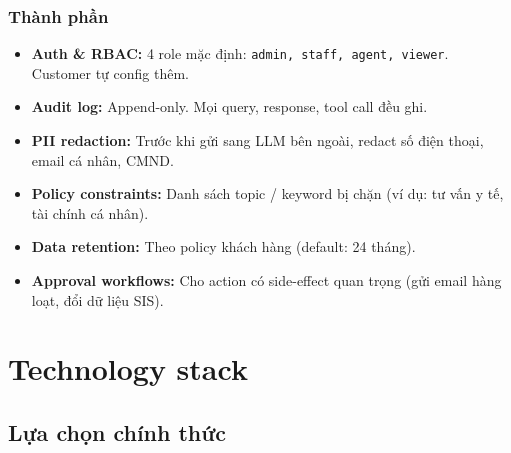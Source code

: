 \documentclass[11pt,a4paper]{article}
\begin{document}
\subsubsection*{Thành phần}
\begin{itemize}
\item \textbf{Auth \& RBAC:} 4 role mặc định: \texttt{admin, staff, agent, viewer}. Customer tự config thêm.
\item \textbf{Audit log:} Append-only. Mọi query, response, tool call đều ghi.
\item \textbf{PII redaction:} Trước khi gửi sang LLM bên ngoài, redact số điện thoại, email cá nhân, CMND.
\item \textbf{Policy constraints:} Danh sách topic / keyword bị chặn (ví dụ: tư vấn y tế, tài chính cá nhân).
\item \textbf{Data retention:} Theo policy khách hàng (default: 24 tháng).
\item \textbf{Approval workflows:} Cho action có side-effect quan trọng (gửi email hàng loạt, đổi dữ liệu SIS).
\end{itemize}

\clearpage

\section{Technology stack}

\subsection{Lựa chọn chính thức}
\end{document}
